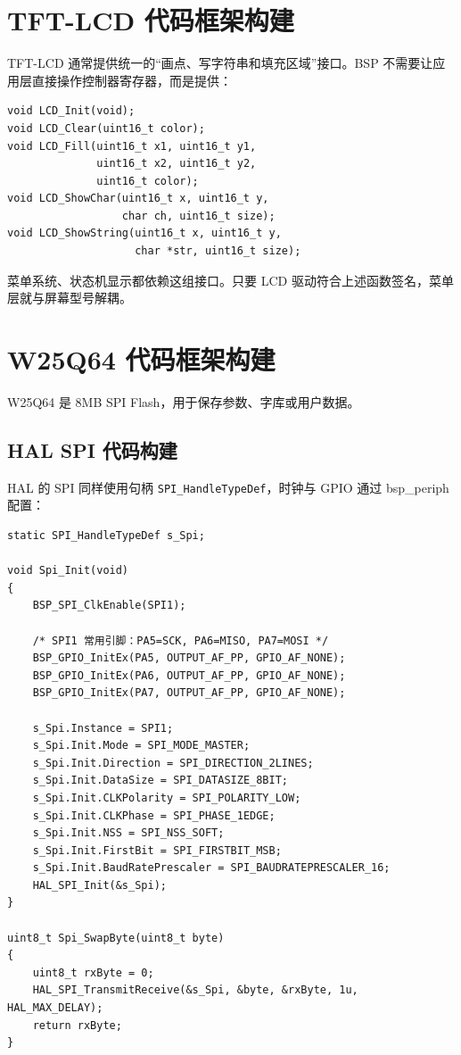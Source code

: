 \section{TFT-LCD 代码框架构建}

TFT-LCD 通常提供统一的“画点、写字符串和填充区域”接口。BSP 不需要让应用层直接操作控制器寄存器，而是提供：

\begin{lstlisting}[style=c]
void LCD_Init(void);
void LCD_Clear(uint16_t color);
void LCD_Fill(uint16_t x1, uint16_t y1,
              uint16_t x2, uint16_t y2,
              uint16_t color);
void LCD_ShowChar(uint16_t x, uint16_t y,
                  char ch, uint16_t size);
void LCD_ShowString(uint16_t x, uint16_t y,
                    char *str, uint16_t size);
\end{lstlisting}

菜单系统、状态机显示都依赖这组接口。只要 LCD 驱动符合上述函数签名，菜单层就与屏幕型号解耦。

\section{W25Q64 代码框架构建}

W25Q64 是 8MB SPI Flash，用于保存参数、字库或用户数据。

\subsection{HAL SPI 代码构建}

HAL 的 SPI 同样使用句柄 \texttt{SPI\_HandleTypeDef}，时钟与 GPIO 通过 bsp\_periph 配置：

\begin{lstlisting}[style=c]
static SPI_HandleTypeDef s_Spi;

void Spi_Init(void)
{
    BSP_SPI_ClkEnable(SPI1);

    /* SPI1 常用引脚：PA5=SCK, PA6=MISO, PA7=MOSI */
    BSP_GPIO_InitEx(PA5, OUTPUT_AF_PP, GPIO_AF_NONE);
    BSP_GPIO_InitEx(PA6, OUTPUT_AF_PP, GPIO_AF_NONE);
    BSP_GPIO_InitEx(PA7, OUTPUT_AF_PP, GPIO_AF_NONE);

    s_Spi.Instance = SPI1;
    s_Spi.Init.Mode = SPI_MODE_MASTER;
    s_Spi.Init.Direction = SPI_DIRECTION_2LINES;
    s_Spi.Init.DataSize = SPI_DATASIZE_8BIT;
    s_Spi.Init.CLKPolarity = SPI_POLARITY_LOW;
    s_Spi.Init.CLKPhase = SPI_PHASE_1EDGE;
    s_Spi.Init.NSS = SPI_NSS_SOFT;
    s_Spi.Init.FirstBit = SPI_FIRSTBIT_MSB;
    s_Spi.Init.BaudRatePrescaler = SPI_BAUDRATEPRESCALER_16;
    HAL_SPI_Init(&s_Spi);
}

uint8_t Spi_SwapByte(uint8_t byte)
{
    uint8_t rxByte = 0;
    HAL_SPI_TransmitReceive(&s_Spi, &byte, &rxByte, 1u, HAL_MAX_DELAY);
    return rxByte;
}
\end{lstlisting}


